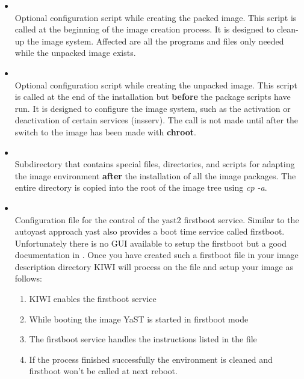 \begin{itemize}
\item {}\\
      Optional configuration script while creating the packed image.
      This script is called at the beginning of the image creation process.
      It is designed to clean-up the image system. Affected are all the
      programs and files only needed while the unpacked image exists.

\item {}\\
      Optional configuration script while creating the unpacked image. This
      script is called at the end of the installation but \textbf{before}
      the package scripts have run. It is designed to configure the image
      system, such as the activation or deactivation of certain services
      (insserv). The call is not made until after the switch to the image
      has been made with \textbf{chroot}.

\item {}\\
      Subdirectory that contains special files, directories, and scripts for
      adapting the image environment \textbf{after} the installation of all the
      image packages. The entire directory is copied into the root of the
      image tree using \textit{cp -a}.

\item {}\\
      Configuration file for the control of the yast2 firstboot service.
      Similar to the autoyast approach yast also provides a boot time
      service called firstboot. Unfortunately there is no GUI available
      to setup the firstboot but a good documentation in
      . Once you have 
      created such a firstboot file in your image description directory KIWI
      will process on the file and setup your image as follows:

      \begin{enumerate}
      \item KIWI enables the firstboot service
      \item While booting the image YaST is started in firstboot mode
      \item The firstboot service handles the instructions listed in the
             file
      \item If the process finished successfully the environment is
            cleaned and firstboot won't be called at next reboot.
      \end{enumerate}


\end{itemize}
